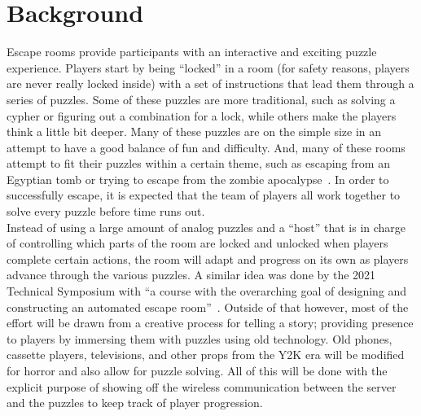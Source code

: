 \documentclass[conference]{IEEEtran}
\begin{document}
\section{Background}
\indent Escape rooms provide participants with an interactive and exciting puzzle experience.
Players start by being ``locked'' in a room (for safety reasons, players are never really
locked inside) with a set of instructions that lead them through a series of puzzles. Some of
these puzzles are more traditional, such as solving a cypher or figuring out a combination for a lock,
while others make the players think a little bit deeper. Many of these puzzles are on the simple size in
an attempt to have a good balance of fun and difficulty. And, many of these rooms attempt to fit their
puzzles within a certain theme, such as escaping from an Egyptian tomb or trying to escape from the zombie
apocalypse~\cite{wikipediaEscapeRoom}. In order to successfully escape, it is expected that the team of players
all work together to solve every puzzle before time runs out.
\\
\indent Instead of using a large amount of analog puzzles and a ``host'' that is in charge of controlling which parts of
the room are locked and unlocked when players complete certain actions, the room will adapt and progress on its
own as players advance through the various puzzles. A similar idea was done by the 2021 Technical Symposium with
``a course with the overarching goal of designing and constructing an automated escape room''~\cite{germanEscapeRoom}. Outside
of that however, most of the effort will be drawn from a creative process for telling a story; providing presence
to players by immersing them with puzzles using old technology. Old phones, cassette players, televisions, and other
props from the Y2K era will be modified for horror and also allow for puzzle solving. All of this will be done
with the explicit purpose of showing off the wireless communication between the server and the puzzles to keep track
of player progression. 

\end{document}
